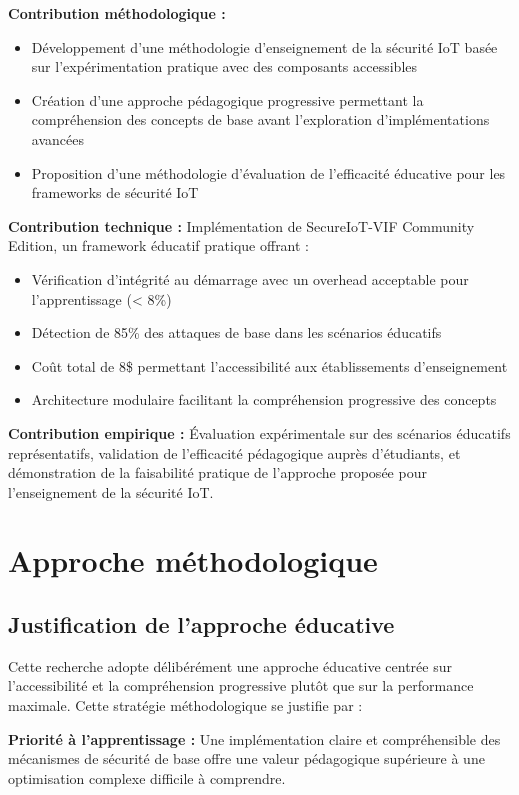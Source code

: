 \textbf{Contribution méthodologique :} 
\begin{itemize}
    \item Développement d'une méthodologie d'enseignement de la sécurité IoT basée sur l'expérimentation pratique avec des composants accessibles
    \item Création d'une approche pédagogique progressive permettant la compréhension des concepts de base avant l'exploration d'implémentations avancées
    \item Proposition d'une méthodologie d'évaluation de l'efficacité éducative pour les frameworks de sécurité IoT
\end{itemize}

\textbf{Contribution technique :} Implémentation de SecureIoT-VIF Community Edition, un framework éducatif pratique offrant :
\begin{itemize}
    \item Vérification d'intégrité au démarrage avec un overhead acceptable pour l'apprentissage (< 8\%)
    \item Détection de 85\% des attaques de base dans les scénarios éducatifs
    \item Coût total de 8\$ permettant l'accessibilité aux établissements d'enseignement
    \item Architecture modulaire facilitant la compréhension progressive des concepts
\end{itemize}

\textbf{Contribution empirique :} Évaluation expérimentale sur des scénarios éducatifs représentatifs, validation de l'efficacité pédagogique auprès d'étudiants, et démonstration de la faisabilité pratique de l'approche proposée pour l'enseignement de la sécurité IoT.

\section{Approche méthodologique}

\subsection{Justification de l'approche éducative}

Cette recherche adopte délibérément une approche éducative centrée sur l'accessibilité et la compréhension progressive plutôt que sur la performance maximale. Cette stratégie méthodologique se justifie par :

\textbf{Priorité à l'apprentissage :} Une implémentation claire et compréhensible des mécanismes de sécurité de base offre une valeur pédagogique supérieure à une optimisation complexe difficile à comprendre.


